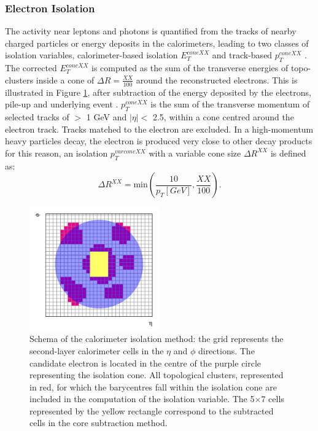 \subsubsection{Electron Isolation}
\label{chap2:Objects:Egamma:EIso}
The activity near leptons and photons is quantified from the tracks of nearby charged particles or energy deposits in the calorimeters, leading to two classes of isolation variables, calorimeter-based isolation $E^{coneXX}_{T}$ and track-based $p_T^{coneXX}$ \cite{Electron_Reco_Id_Run1}. The corrected $E^{coneXX}_{T}$ is computed as the sum of the transverse energies of topo-clusters inside a cone of $\Delta R = \frac{XX}{100}$ around the reconstructed electrons. This is illustrated in Figure \ref{fig:chap2:Objects:Egamma:EIso:Schema}, after subtraction of the energy deposited by the electrons, pile-up and underlying event \cite{PileUp_IsoExtract}. $p_T^{coneXX}$ is the sum of the transverse momentum of selected tracks of \pT $>$ 1 GeV and $|\eta|<$ 2.5, within a cone centred around the electron track. Tracks matched to the electron are excluded. In a high-momentum heavy particles decay, the electron is produced very close to other decay products for this reason, an isolation $p_T^{varconeXX}$ with a variable cone size $\Delta R^{XX}$ is defined as:
\begin{equation}
    \Delta R^{XX} = \text{min}(\frac{10}{p_T[GeV]}, \frac{XX}{100}).
\end{equation}
\begin{figure}[htbp]
    \centering
    \includegraphics[width=0.5\textwidth]{Ch2/Img/Iso_Schema.png}
    \caption{Schema of the calorimeter isolation method: the grid represents the second-layer calorimeter cells in the $\eta$ and $\phi$ directions. The candidate electron is located in the centre of the purple circle representing the isolation cone. All topological clusters, represented in red, for which the barycentres fall within the isolation cone are included in the computation of the isolation variable. The 5$\times$7 cells represented by the yellow rectangle correspond to the subtracted cells in the core subtraction method.}
    \label{fig:chap2:Objects:Egamma:EIso:Schema}
\end{figure}
